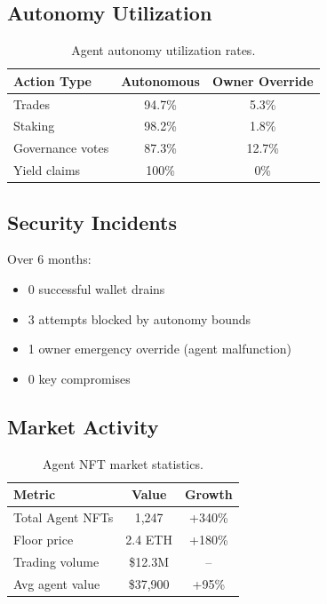 \documentclass[11pt,letterpaper]{article}
\begin{document}
\subsection{Autonomy Utilization}

\begin{table}[t]
\centering
\begin{tabular}{lcc}
\toprule
\textbf{Action Type} & \textbf{Autonomous} & \textbf{Owner Override} \\
\midrule
Trades & 94.7\% & 5.3\% \\
Staking & 98.2\% & 1.8\% \\
Governance votes & 87.3\% & 12.7\% \\
Yield claims & 100\% & 0\% \\
\bottomrule
\end{tabular}
\caption{Agent autonomy utilization rates.}
\label{tab:autonomy}
\end{table}

\subsection{Security Incidents}

Over 6 months:
\begin{itemize}
    \item 0 successful wallet drains
    \item 3 attempts blocked by autonomy bounds
    \item 1 owner emergency override (agent malfunction)
    \item 0 key compromises
\end{itemize}

\subsection{Market Activity}

\begin{table}[t]
\centering
\begin{tabular}{lcc}
\toprule
\textbf{Metric} & \textbf{Value} & \textbf{Growth} \\
\midrule
Total Agent NFTs & 1,247 & +340\% \\
Floor price & 2.4 ETH & +180\% \\
Trading volume & \$12.3M & -- \\
Avg agent value & \$37,900 & +95\% \\
\bottomrule
\end{tabular}
\caption{Agent NFT market statistics.}
\label{tab:market}
\end{table}
\end{document}

